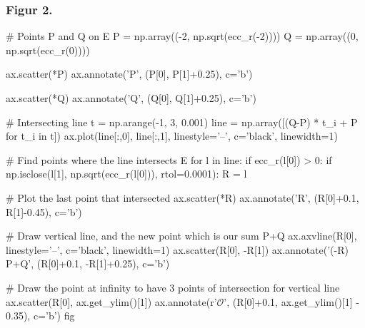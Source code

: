\subsubsection{Figur 2.}
\label{section:figur_2}
\begin{python}
# Points P and Q on E
P = np.array((-2, np.sqrt(ecc_r(-2))))
Q = np.array((0, np.sqrt(ecc_r(0))))

ax.scatter(*P)
ax.annotate('P', (P[0], P[1]+0.25), c='b')

ax.scatter(*Q)
ax.annotate('Q', (Q[0], Q[1]+0.25), c='b')

# Intersecting line
t = np.arange(-1, 3, 0.001)
line = np.array([(Q-P) * t_i + P for t_i in t])
ax.plot(line[:,0], line[:,1], linestyle='--', c='black', linewidth=1)

# Find points where the line intersects E
for l in line:
    if ecc_r(l[0]) > 0:
        if np.isclose(l[1], np.sqrt(ecc_r(l[0])), rtol=0.0001):
            R = l

# Plot the last point that intersected
ax.scatter(*R)
ax.annotate('R', (R[0]+0.1, R[1]-0.45), c='b')

# Draw vertical line, and the new point which is our sum P+Q
ax.axvline(R[0], linestyle='--', c='black', linewidth=1)
ax.scatter(R[0], -R[1])
ax.annotate('(-R) P+Q', (R[0]+0.1, -R[1]+0.25), c='b')

# Draw the point at infinity to have 3 points of intersection for vertical line
ax.scatter(R[0], ax.get_ylim()[1])
ax.annotate(r'$\mathcal{O}$', (R[0]+0.1, ax.get_ylim()[1] - 0.35), c='b')
fig
\end{python}

